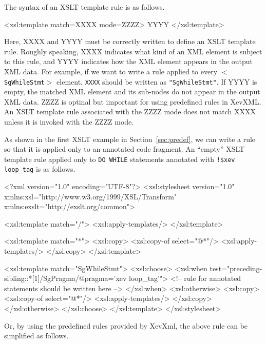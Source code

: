 The syntax of an XSLT template rule is as follows.
\begin{framed}
\begin{src}
<xsl:template match=XXXX mode=ZZZZ>
   YYYY
</xsl:template>
\end{src}
\end{framed}
Here, XXXX and YYYY must be correctly written to define an XSLT template
rule.  Roughly speaking, XXXX indicates what kind of an XML element is
subject to this rule, and YYYY indicates how the XML element appears in
the output XML data.  For example, if we want to write a rule applied to
every \texttt{$<$SgWhileStmt$>$} element, \texttt{XXXX} should be
written as \texttt{"SgWhileStmt"}. If YYYY is empty, the matched XML
element and its sub-nodes do not appear in the output XML data. ZZZZ is
optinal but important for using predefined rules in XevXML. An XSLT
template rule associated with the ZZZZ mode does not match XXXX unless
it is invoked with the ZZZZ mode.

As shown in the first XSLT example in Section~\ref{sec:predef}, we can
write a rule so that it is applied only to an annotated code fragment.
An ``empty'' XSLT template rule applied only to \texttt{DO WHILE}
statements annotated with \texttt{!\$xev loop\_tag} is as follows.
\begin{framed}
\begin{src}
<?xml version="1.0" encoding="UTF-8"?>
<xsl:stylesheet version="1.0"
		xmlns:xsl="http://www.w3.org/1999/XSL/Transform"
		xmlns:exslt="http://exslt.org/common">

  <xsl:template match="/">
    <xsl:apply-templates/>
  </xsl:template>

  <xsl:template match="*">
    <xsl:copy>
      <xsl:copy-of select="@*"/>
      <xsl:apply-templates/>
    </xsl:copy>
  </xsl:template>

  <xsl:template match="SgWhileStmt">
    <xsl:choose>
      <xsl:when test="preceding-sibling::*[1]/SgPragma/@pragma='xev loop_tag'">
	<!-- rule for annotated statements should be written here -->
      </xsl:when>
      <xsl:otherwise>
	<xsl:copy>
	  <xsl:copy-of select="@*"/>
	  <xsl:apply-templates/>
	</xsl:copy>
      </xsl:otherwise>
    </xsl:choose>
  </xsl:template>
</xsl:stylesheet>
\end{src}
\end{framed}

Or, by using the predefined rules provided by XevXml, the above rule can
be simplified as follows.


